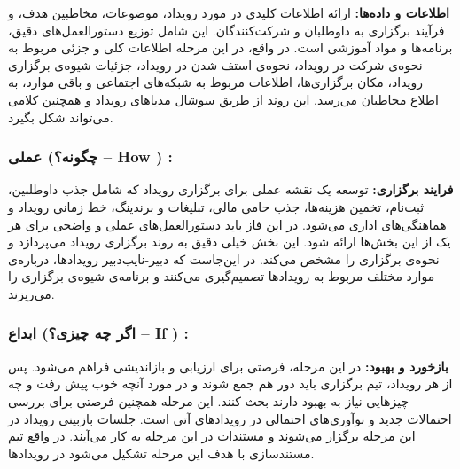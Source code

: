 \textbf{اطلاعات و داده‌ها:}
ارائه اطلاعات کلیدی در مورد رویداد، موضوعات، مخاطبین هدف، و فرآیند برگزاری به داوطلبان و شرکت‌کنندگان. این شامل توزیع دستورالعمل‌های دقیق، برنامه‌ها و مواد آموزشی است. در واقع، در این مرحله اطلاعات کلی و جزئی مربوط به نحوه‌ی شرکت در رویداد، نحوه‌ی استف شدن در رویداد، جزئیات شیوه‌ی برگزاری رویداد، مکان برگزاری‌ها، اطلاعات مربوط به شبکه‌های اجتماعی و باقی موارد، به اطلاع مخاطبان می‌رسد. این روند از طریق سوشال مدیاهای رویداد و همچنین کلامی می‌تواند شکل بگیرد.

\subsubsection*{عملی (چگونه؟ – How ) :}

\textbf{فرایند برگزاری:}
توسعه یک نقشه عملی برای برگزاری رویداد که شامل جذب داوطلبین، ثبت‌نام، تخمین هزینه‌ها، جذب حامی مالی، تبلیغات و برندینگ، خط زمانی رویداد و هماهنگی‌های اداری می‌شود. در این فاز باید دستورالعمل‌های عملی و واضحی برای هر یک از این بخش‌ها ارائه شود. این بخش خیلی دقیق به روند برگزاری رویداد می‌پردازد و نحوه‌ی برگزاری را مشخص می‌کند. در این‌جاست که دبیر-نایب‌دبیر رویدادها، درباره‌ی موارد مختلف مربوط به رویدادها تصمیم‌گیری می‌کنند و برنامه‌ی شیوه‌ی برگزاری را می‌ریزند. 

\subsubsection*{ابداع (اگر چه چیزی؟ – If ) :}

\textbf{بازخورد و بهبود:}
در این مرحله، فرصتی برای ارزیابی و بازاندیشی فراهم می‌شود. پس از هر رویداد، تیم برگزاری باید دور هم جمع شوند و در مورد آنچه خوب پیش رفت و چه چیزهایی نیاز به بهبود دارند بحث کنند. این مرحله همچنین فرصتی برای بررسی احتمالات جدید و نوآوری‌های احتمالی در رویدادهای آتی است. جلسات بازبینی رویداد در این مرحله برگزار می‌شوند و مستندات در این مرحله به کار می‌آیند. در واقع تیم مستندسازی با هدف این مرحله تشکیل می‌شود در رویدادها.

